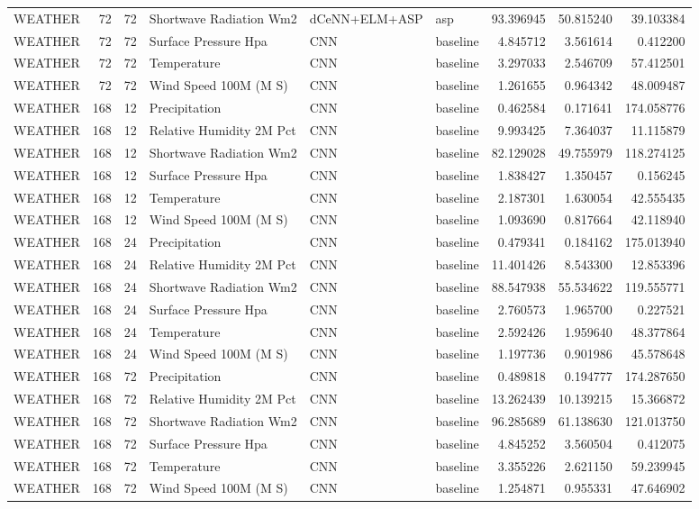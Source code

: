 \begin{table}
\begin{tabular}{lrrlllrrr}
WEATHER & 72 & 72 & Shortwave Radiation Wm2 & dCeNN+ELM+ASP & asp & 93.396945 & 50.815240 & 39.103384 \\
WEATHER & 72 & 72 & Surface Pressure Hpa & CNN & baseline & 4.845712 & 3.561614 & 0.412200 \\
WEATHER & 72 & 72 & Temperature & CNN & baseline & 3.297033 & 2.546709 & 57.412501 \\
WEATHER & 72 & 72 & Wind Speed 100M (M S) & CNN & baseline & 1.261655 & 0.964342 & 48.009487 \\
WEATHER & 168 & 12 & Precipitation & CNN & baseline & 0.462584 & 0.171641 & 174.058776 \\
WEATHER & 168 & 12 & Relative Humidity 2M Pct & CNN & baseline & 9.993425 & 7.364037 & 11.115879 \\
WEATHER & 168 & 12 & Shortwave Radiation Wm2 & CNN & baseline & 82.129028 & 49.755979 & 118.274125 \\
WEATHER & 168 & 12 & Surface Pressure Hpa & CNN & baseline & 1.838427 & 1.350457 & 0.156245 \\
WEATHER & 168 & 12 & Temperature & CNN & baseline & 2.187301 & 1.630054 & 42.555435 \\
WEATHER & 168 & 12 & Wind Speed 100M (M S) & CNN & baseline & 1.093690 & 0.817664 & 42.118940 \\
WEATHER & 168 & 24 & Precipitation & CNN & baseline & 0.479341 & 0.184162 & 175.013940 \\
WEATHER & 168 & 24 & Relative Humidity 2M Pct & CNN & baseline & 11.401426 & 8.543300 & 12.853396 \\
WEATHER & 168 & 24 & Shortwave Radiation Wm2 & CNN & baseline & 88.547938 & 55.534622 & 119.555771 \\
WEATHER & 168 & 24 & Surface Pressure Hpa & CNN & baseline & 2.760573 & 1.965700 & 0.227521 \\
WEATHER & 168 & 24 & Temperature & CNN & baseline & 2.592426 & 1.959640 & 48.377864 \\
WEATHER & 168 & 24 & Wind Speed 100M (M S) & CNN & baseline & 1.197736 & 0.901986 & 45.578648 \\
WEATHER & 168 & 72 & Precipitation & CNN & baseline & 0.489818 & 0.194777 & 174.287650 \\
WEATHER & 168 & 72 & Relative Humidity 2M Pct & CNN & baseline & 13.262439 & 10.139215 & 15.366872 \\
WEATHER & 168 & 72 & Shortwave Radiation Wm2 & CNN & baseline & 96.285689 & 61.138630 & 121.013750 \\
WEATHER & 168 & 72 & Surface Pressure Hpa & CNN & baseline & 4.845252 & 3.560504 & 0.412075 \\
WEATHER & 168 & 72 & Temperature & CNN & baseline & 3.355226 & 2.621150 & 59.239945 \\
WEATHER & 168 & 72 & Wind Speed 100M (M S) & CNN & baseline & 1.254871 & 0.955331 & 47.646902 \\
\bottomrule
\end{tabular}
\end{table}
